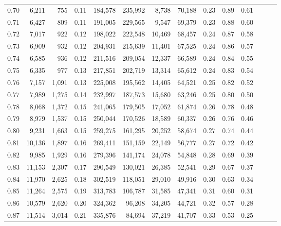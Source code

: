 \begin{tabular}{rrrrrrrrrrrrrr}
0.70 &   6,211 &    755 &  0.11 &  184,578 &  235,992 &   8,738 &  70,188 &  0.23 &  0.89 &      0.61 \\
0.71 &   6,427 &    809 &  0.11 &  191,005 &  229,565 &   9,547 &  69,379 &  0.23 &  0.88 &      0.60 \\
0.72 &   7,017 &    922 &  0.12 &  198,022 &  222,548 &  10,469 &  68,457 &  0.24 &  0.87 &      0.58 \\
0.73 &   6,909 &    932 &  0.12 &  204,931 &  215,639 &  11,401 &  67,525 &  0.24 &  0.86 &      0.57 \\
0.74 &   6,585 &    936 &  0.12 &  211,516 &  209,054 &  12,337 &  66,589 &  0.24 &  0.84 &      0.55 \\
0.75 &   6,335 &    977 &  0.13 &  217,851 &  202,719 &  13,314 &  65,612 &  0.24 &  0.83 &      0.54 \\
0.76 &   7,157 &  1,091 &  0.13 &  225,008 &  195,562 &  14,405 &  64,521 &  0.25 &  0.82 &      0.52 \\
0.77 &   7,989 &  1,275 &  0.14 &  232,997 &  187,573 &  15,680 &  63,246 &  0.25 &  0.80 &      0.50 \\
0.78 &   8,068 &  1,372 &  0.15 &  241,065 &  179,505 &  17,052 &  61,874 &  0.26 &  0.78 &      0.48 \\
0.79 &   8,979 &  1,537 &  0.15 &  250,044 &  170,526 &  18,589 &  60,337 &  0.26 &  0.76 &      0.46 \\
0.80 &   9,231 &  1,663 &  0.15 &  259,275 &  161,295 &  20,252 &  58,674 &  0.27 &  0.74 &      0.44 \\
0.81 &  10,136 &  1,897 &  0.16 &  269,411 &  151,159 &  22,149 &  56,777 &  0.27 &  0.72 &      0.42 \\
0.82 &   9,985 &  1,929 &  0.16 &  279,396 &  141,174 &  24,078 &  54,848 &  0.28 &  0.69 &      0.39 \\
0.83 &  11,153 &  2,307 &  0.17 &  290,549 &  130,021 &  26,385 &  52,541 &  0.29 &  0.67 &      0.37 \\
0.84 &  11,970 &  2,625 &  0.18 &  302,519 &  118,051 &  29,010 &  49,916 &  0.30 &  0.63 &      0.34 \\
0.85 &  11,264 &  2,575 &  0.19 &  313,783 &  106,787 &  31,585 &  47,341 &  0.31 &  0.60 &      0.31 \\
0.86 &  10,579 &  2,620 &  0.20 &  324,362 &   96,208 &  34,205 &  44,721 &  0.32 &  0.57 &      0.28 \\
0.87 &  11,514 &  3,014 &  0.21 &  335,876 &   84,694 &  37,219 &  41,707 &  0.33 &  0.53 &      0.25 \\

\end{tabular}
